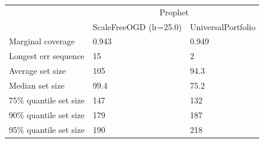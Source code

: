 \begin{tabular}{lll}
\toprule
& \multicolumn{2}{c}{Prophet} \\
& ScaleFreeOGD (lr=25.0) & UniversalPortfolio \\
\midrule
Marginal coverage & 0.943 & 0.949 \\
Longest err sequence & 15 & 2 \\
Average set size & 105 & 94.3 \\
Median set size & 99.4 & 75.2 \\
75\% quantile set size & 147 & 132 \\
90\% quantile set size & 179 & 187 \\
95\% quantile set size & 190 & 218 \\
\bottomrule
\end{tabular}
